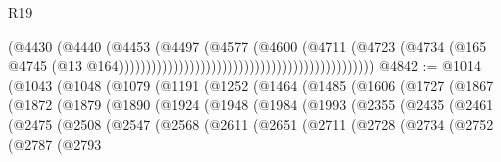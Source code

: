 \begin{lexlean}{R19}
\begin{coremodule}
                                                                            (@4430
                                                                              (@4440
                                                                                (@4453
                                                                                  (@4497
                                                                                    (@4577
                                                                                      (@4600
                                                                                        (@4711
                                                                                          (@4723
                                                                                            (@4734
                                                                                              (@165
                                                                                                @4745
                                                                                                (@13
                                                                                                  @164)))))))))))))))))))))))))))))))))))))))))))))))
@4842 := @1014
    (@1043
      (@1048
        (@1079
          (@1191
            (@1252
              (@1464
                (@1485
                  (@1606
                    (@1727
                      (@1867
                        (@1872
                          (@1879
                            (@1890
                              (@1924
                                (@1948
                                  (@1984
                                    (@1993
                                      (@2355
                                        (@2435
                                          (@2461
                                            (@2475
                                              (@2508
                                                (@2547
                                                  (@2568
                                                    (@2611
                                                      (@2651
                                                        (@2711
                                                          (@2728
                                                            (@2734
                                                              (@2752
                                                                (@2787
                                                                  (@2793

\end{coremodule}
\end{lexlean}
